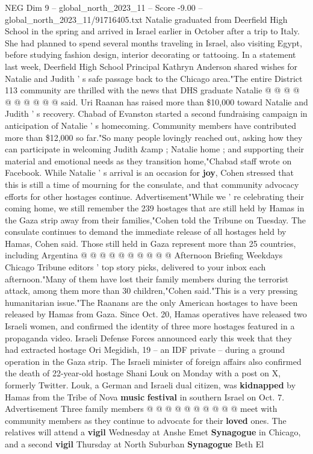 \begin{textsample}{NEG Dim 9 – global\_north\_2023\_11 – Score -9.00 – global\_north\_2023\_11/91716405.txt}
Natalie graduated from Deerfield High School in the spring and arrived in Israel earlier in October after a trip to Italy.
She had planned to spend several months traveling in Israel, also visiting Egypt, before studying fashion design, interior decorating or tattooing.
In a statement last week, Deerfield High School Principal Kathryn Anderson shared wishes for Natalie and Judith ' s safe passage back to the Chicago area."The entire District 113 community are thrilled with the news that DHS graduate Natalie @ @ @ @ @ @ @ @ @ @ said.
Uri Raanan has raised more than \$10,000 toward Natalie and Judith ' s recovery.
Chabad of Evanston started a second fundraising campaign in anticipation of Natalie ' s homecoming.
Community members have contributed more than \$12,000 so far."So many people lovingly reached out, asking how they can participate in welcoming Judith \&amp ; Natalie home ; and supporting their material and emotional needs as they transition home,"Chabad staff wrote on Facebook.
While Natalie ' s arrival is an occasion for \textbf{joy}, Cohen stressed that this is still a time of mourning for the consulate, and that community advocacy efforts for other hostages continue.
Advertisement"While we ' re celebrating their coming home, we still remember the 239 hostages that are still held by Hamas in the Gaza strip away from their families,"Cohen told the Tribune on Tuesday.
The consulate continues to demand the immediate release of all hostages held by Hamas, Cohen said.
Those still held in Gaza represent more than 25 countries, including Argentina @ @ @ @ @ @ @ @ @ @ Afternoon Briefing Weekdays Chicago Tribune editors ' top story picks, delivered to your inbox each afternoon."Many of them have lost their family members during the terrorist attack, among them more than 30 children,"Cohen said."This is a very pressing humanitarian issue."The Raanans are the only American hostages to have been released by Hamas from Gaza.
Since Oct. 20, Hamas operatives have released two Israeli women, and confirmed the identity of three more hostages featured in a propaganda video.
Israeli Defense Forces announced early this week that they had extracted hostage Ori Megidish, 19 -- an IDF private -- during a ground operation in the Gaza strip.
The Israeli minister of foreign affairs also confirmed the death of 22-year-old hostage Shani Louk on Monday with a post on X, formerly Twitter.
Louk, a German and Israeli dual citizen, was \textbf{kidnapped} by Hamas from the Tribe of Nova \textbf{music} \textbf{festival} in southern Israel on Oct. 7.
Advertisement Three family members @ @ @ @ @ @ @ @ @ @ meet with community members as they continue to advocate for their \textbf{loved} ones.
The relatives will attend a \textbf{vigil} Wednesday at Anshe Emet \textbf{Synagogue} in Chicago, and a second \textbf{vigil} Thursday at North Suburban \textbf{Synagogue} Beth El

\end{textsample}
